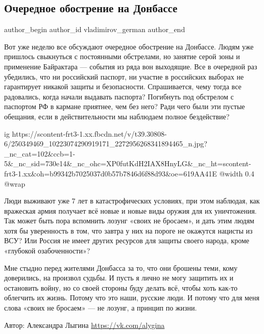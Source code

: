  
 
 
 
 
 
\subsection{Очередное обострение на Донбассе}
\label{sec:01_11_2021.fb.vladimirov_german.1.obostrenie_donbass}
 
\ifcmt
 author_begin
   author_id vladimirov_german
 author_end
\fi

Вот уже неделю все обсуждают очередное обострение на Донбассе. Людям уже
пришлось свыкнуться с постоянными обстрелами, но занятие серой зоны и
применение Байрактара — события из ряда вон выходящие. Все в очередной раз
убедились, что ни российский паспорт, ни участие в российских выборах не
гарантирует никакой защиты и безопасности. Спрашивается, чему тогда все
радовались, когда начали выдавать паспорта? Погибнуть под обстрелом с паспортом
РФ в кармане приятнее, чем без него? Ради чего были эти пустые обещания, если в
действительности мы наблюдаем полное бездействие?

\ifcmt
  ig https://scontent-frt3-1.xx.fbcdn.net/v/t39.30808-6/250349469_10223074290919171_2272956268341894465_n.jpg?_nc_cat=102&ccb=1-5&_nc_sid=730e14&_nc_ohc=XP0futKdH2IAX8HnyLG&_nc_ht=scontent-frt3-1.xx&oh=b99342b7025037d0b57b7846d6f88d93&oe=619AA41E
  @width 0.4
  @wrap 
\fi

Люди выживают уже 7 лет в катастрофических условиях, при этом наблюдая, как
вражеская армия получает всё новые и новые виды оружия для их уничтожения. Так
может быть пора вспомнить лозунг «своих не бросаем», и дать этим людям хотя бы
уверенность в том, что завтра у них на пороге не окажутся нацисты из ВСУ? Или
Россия не имеет других ресурсов для защиты своего народа, кроме «глубокой
озабоченности»?

Мне стыдно перед жителями Донбасса за то, что они брошены теми, кому
доверились, на произвол судьбы. И пусть я лично не могу защитить их и
остановить войну, но со своей стороны буду делать всё, чтобы хоть как-то
облегчить их жизнь. Потому что это наши, русские люди. И потому что для меня
слова «своих не бросаем» — не лозунг, а принцип по жизни.

Автор: Александра Лыгина \url{https://vk.com/alygina}

